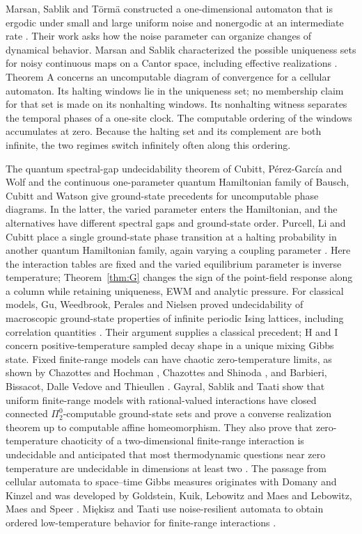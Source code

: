 Marsan, Sablik and T\"orm\"a constructed a one-dimensional automaton that is ergodic under small and large uniform noise and nonergodic at an intermediate rate \cite{mst}. Their work asks how the noise parameter can organize changes of dynamical behavior. Marsan and Sablik characterized the possible uniqueness sets for noisy continuous maps on a Cantor space, including effective realizations \cite{msMaps}. Theorem A concerns an uncomputable diagram of convergence for a cellular automaton. Its halting windows lie in the uniqueness set; no membership claim for that set is made on its nonhalting windows. Its nonhalting witness separates the temporal phases of a one-site clock. The computable ordering of the windows accumulates at zero. Because the halting set and its complement are both infinite, the two regimes switch infinitely often along this ordering.

The quantum spectral-gap undecidability theorem of Cubitt, P\'erez-Garc\'ia and Wolf \cite{cpw} and the continuous one-parameter quantum Hamiltonian family of Bausch, Cubitt and Watson \cite{bcw} give ground-state precedents for uncomputable phase diagrams. In the latter, the varied parameter enters the Hamiltonian, and the alternatives have different spectral gaps and ground-state order. Purcell, Li and Cubitt place a single ground-state phase transition at a halting probability in another quantum Hamiltonian family, again varying a coupling parameter \cite{plc}. Here the interaction tables are fixed and the varied equilibrium parameter is inverse temperature; Theorem~\ref{thm:G} changes the sign of the point-field response along a column while retaining uniqueness, EWM and analytic pressure. For classical models, Gu, Weedbrook, Perales and Nielsen proved undecidability of macroscopic ground-state properties of infinite periodic Ising lattices, including correlation quantities \cite{gwpn}. Their argument supplies a classical precedent; H and I concern positive-temperature sampled decay shape in a unique mixing Gibbs state. Fixed finite-range models can have chaotic zero-temperature limits, as shown by Chazottes and Hochman \cite{ch}, Chazottes and Shinoda \cite{cs}, and Barbieri, Bissacot, Dalle Vedove and Thieullen \cite{bbdt}. Gayral, Sablik and Taati show that uniform finite-range models with rational-valued interactions have closed connected \(\Pi^0_2\)-computable ground-state sets and prove a converse realization theorem up to computable affine homeomorphism. They also prove that zero-temperature chaoticity of a two-dimensional finite-range interaction is undecidable and anticipated that most thermodynamic questions near zero temperature are undecidable in dimensions at least two \cite{gst}. The passage from cellular automata to space--time Gibbs measures originates with Domany and Kinzel \cite{dk} and was developed by Goldstein, Kuik, Lebowitz and Maes \cite{gklm} and Lebowitz, Maes and Speer \cite{lms}. Mi\k{e}kisz and Taati use noise-resilient automata to obtain ordered low-temperature behavior for finite-range interactions \cite{mtaati}.

